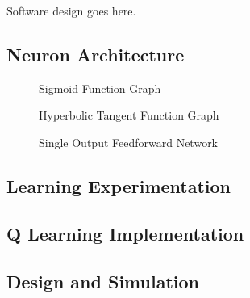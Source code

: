 Software design goes here.

\subsection{Neuron Architecture}

\begin{figure}
	\centering
	
	\caption{Sigmoid Function Graph}
\end{figure}

\begin{figure} [h]
	\centering
	
	\caption{Hyperbolic Tangent Function Graph}
\end{figure}

\begin{figure} [h]
	\centering
	
	\caption{Single Output Feedforward Network}
\end{figure}


\subsection{Learning Experimentation}


\subsection{Q Learning Implementation}

\subsection{Design and Simulation}
